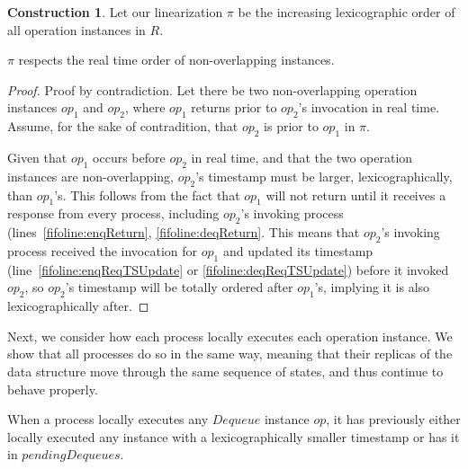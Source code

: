 \documentclass[a4paper,anonymous,USenglish]{lipics-v2021} %
\theoremstyle{definition}
\newtheorem{construction}{Construction}
\begin{document}
\begin{construction}
  Let our linearization $\pi$ be the increasing lexicographic order of all operation instances in $R$.
\end{construction}

\begin{lemma}
  $\pi$ respects the real time order of non-overlapping instances.
\end{lemma}
\begin{proof}
  Proof by contradiction. Let there be two non-overlapping operation instances $op_1$ and $op_2$, where $op_1$ returns prior to $op_2$'s invocation in real time.  Assume, for the sake of contradition, that $op_2$ is prior to $op_1$ in $\pi$.
  
  Given that $op_1$ occurs before $op_2$ in real time, and that the two operation instances are non-overlapping, $op_2$'s timestamp must be larger, lexicographically, than $op_1$'s.  This follows from the fact that $op_1$ will not return until it receives a response from every process, including $op_2$'s invoking process (lines~\ref{fifoline:enqReturn}, \ref{fifoline:deqReturn}.  This means that $op_2$'s invoking process received the invocation for $op_1$ and updated its timestamp (line~\ref{fifoline:enqReqTSUpdate} or \ref{fifoline:deqReqTSUpdate}) before it invoked $op_2$, so $op_2$'s timestamp will be totally ordered after $op_1$'s, implying it is also lexicographically after.
\end{proof}

Next, we consider how each process locally executes each operation instance.  We show that all processes do so in the same way, meaning that their replicas of the data structure move through the same sequence of states, and thus continue to behave properly.

\begin{lemma}
  When a process locally executes any $Dequeue$ instance $op$, it has previously either locally executed any instance with a lexicographically smaller timestamp or has it in $pendingDequeues$.
\end{lemma}
\end{document}
